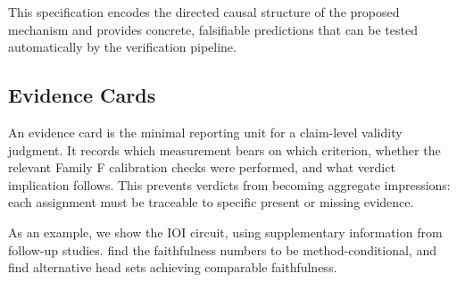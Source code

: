 \documentclass[10pt]{article}
\begin{document}
This specification encodes the directed causal structure of the proposed mechanism and provides concrete, falsifiable predictions that can be tested automatically by the verification pipeline.

\subsection{Evidence Cards}

\label{appendix:evidence-cards}


An evidence card is the minimal reporting unit for a claim-level validity judgment.
It records which measurement bears on which criterion, whether the relevant
Family F calibration checks were performed, and what verdict implication follows.
This prevents verdicts from becoming aggregate impressions: each assignment must
be traceable to specific present or missing evidence.

As an example, we show the IOI circuit, using supplementary information from follow-up studies.
\citep{miller2024transformer} find the faithfulness numbers to be method-conditional, and \citep{meloux2025everything} find alternative head sets achieving comparable faithfulness.
\end{document}

